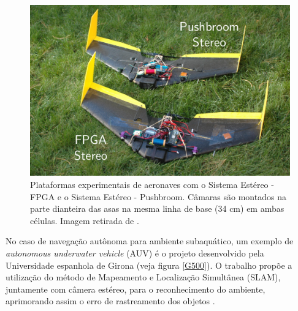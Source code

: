 \begin{figure}[H]
 	\centering
 	\includegraphics[scale=0.26]{./Resources/mit_drones.png}
 	\caption{Plataformas experimentais de aeronaves com o Sistema Estéreo - FPGA e o Sistema Estéreo - Pushbroom. Câmaras são montados na parte dianteira das asas na mesma linha de base (34 cm) em ambas células. Imagem retirada de \cite{BarryMIT}.}
 	\label{mit_drones}
\end{figure}

No caso de navegação autônoma para ambiente subaquático, um exemplo de \textit{autonomous underwater vehicle} (AUV) é o projeto desenvolvido pela Universidade espanhola de Girona (veja figura \ref{G500}). O trabalho propõe a utilização do método de Mapeamento e Localização Simultânea (SLAM), juntamente com câmera estéreo, para o reconhecimento do ambiente, aprimorando assim o erro de rastreamento dos objetos \cite{Nagappa2013}.

